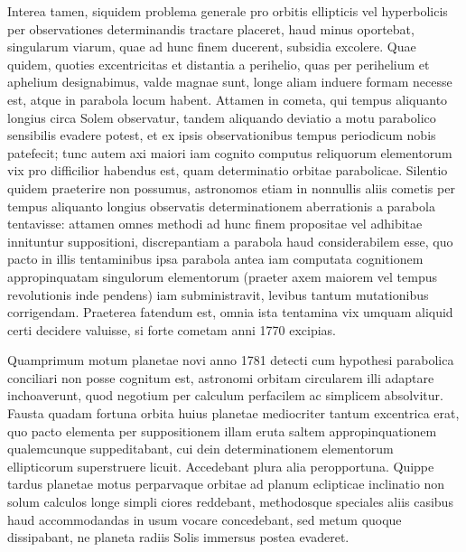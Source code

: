 \documentclass[12pt,a4paper]{book}
\begin{document}
Interea tamen, siquidem problema generale pro orbitis ellipticis vel hyperbolicis per observationes determinandis tractare placeret, haud minus oportebat, singularum viarum, quae ad hunc finem ducerent, subsidia excolere. Quae quidem, quoties excentricitas et distantia a perihelio, quas per perihelium et aphelium designabimus, valde magnae sunt, longe aliam induere formam necesse est, atque in parabola locum habent. Attamen in cometa, qui tempus aliquanto longius circa Solem observatur, tandem aliquando deviatio a motu parabolico sensibilis evadere potest, et ex ipsis observationibus tempus periodicum nobis patefecit; tunc autem axi maiori iam cognito computus reliquorum elementorum vix pro difficilior habendus est, quam determinatio orbitae parabolicae. Silentio quidem praeterire non possumus, astronomos etiam in nonnullis aliis cometis per tempus aliquanto longius observatis determinationem aberrationis a parabola tentavisse: attamen omnes methodi ad hunc finem propositae vel adhibitae innituntur suppositioni, discrepantiam a parabola haud considerabilem esse, quo pacto in illis tentaminibus ipsa parabola antea iam computata cognitionem appropinquatam singulorum elementorum (praeter axem maiorem vel tempus revolutionis inde pendens) iam subministravit, levibus tantum mutationibus corrigendam. Praeterea fatendum est, omnia ista tentamina vix umquam aliquid certi decidere valuisse, si forte cometam anni 1770 excipias.

Quamprimum motum planetae novi anno 1781 detecti cum hypothesi parabolica conciliari non posse cognitum est, astronomi orbitam circularem illi adaptare inchoaverunt, quod negotium per calculum perfacilem ac simplicem absolvitur. Fausta quadam fortuna orbita huius planetae mediocriter tantum excentrica erat, quo pacto elementa per suppositionem illam eruta saltem appropinquationem qualemcunque suppeditabant, cui dein determinationem elementorum ellipticorum superstruere licuit. Accedebant plura alia peropportuna. Quippe tardus planetae motus perparvaque orbitae ad planum eclipticae inclinatio non solum calculos longe simpli ciores reddebant, methodosque speciales aliis casibus haud accommodandas in usum vocare concedebant, sed metum quoque dissipabant, ne planeta radiis Solis immersus postea evaderet.
\end{document}
